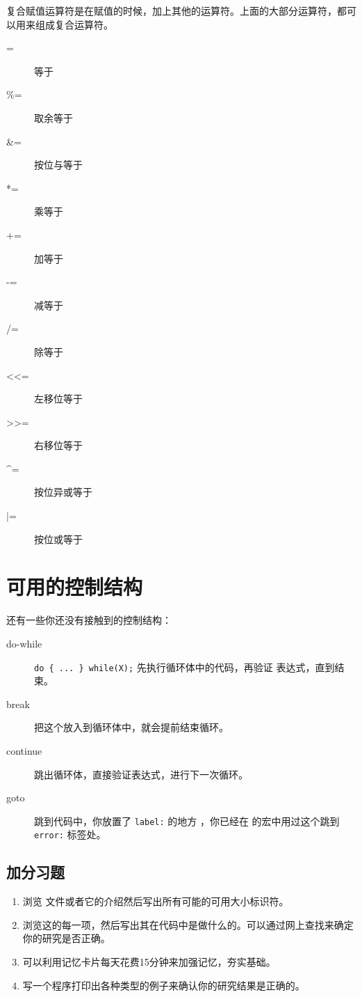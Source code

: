 复合赋值运算符是在赋值的时候，加上其他的运算符。上面的大部分运算符，都可以用来组成复合运算符。

\begin{description}
\item[=] 等于
\item[\%=] 取余等于
\item[\&=] 按位与等于
\item[*=] 乘等于
\item[+=] 加等于
\item[-=] 减等于
\item[/=] 除等于
\item[\textless{}\textless{}=] 左移位等于
\item[\textgreater{}\textgreater{}=] 右移位等于
\item[\^{}=] 按位异或等于
\item[$\vert$=] 按位或等于
\end{description}

\section{可用的控制结构}

还有一些你还没有接触到的控制结构：

\begin{description}
\item[do-while] \verb|do { ... } while(X);| 先执行循环体中的代码，再验证  表达式，直到结束。
\item[break] 把这个放入到循环体中，就会提前结束循环。
\item[continue] 跳出循环体，直接验证表达式，进行下一次循环。
\item[goto] 跳到代码中，你放置了 \verb|label:| 的地方 ，你已经在  的宏中用过这个跳到 \verb|error:| 标签处。
\end{description}


\subsection{加分习题}

\begin{enumerate}
\item 浏览  文件或者它的介绍然后写出所有可能的可用大小标识符。
\item 浏览这的每一项，然后写出其在代码中是做什么的。可以通过网上查找来确定你的研究是否正确。
\item 可以利用记忆卡片每天花费15分钟来加强记忆，夯实基础。
\item 写一个程序打印出各种类型的例子来确认你的研究结果是正确的。
\end{enumerate}

